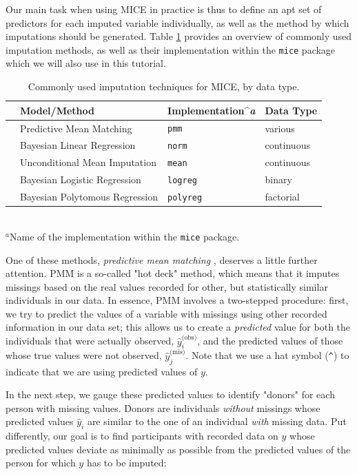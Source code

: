 Our main task when using \textsf{MICE} in practice is thus to define an apt set of predictors for each imputed variable individually, as well as the method by which imputations should be generated. Table \ref{tab:mi-techniques} provides an overview of commonly used imputation methods, as well as their implementation within the \texttt{mice} package \citep{mice-package} which we will also use in this tutorial. 

\begin{table}[htpb]
\centering
\footnotesize
\caption{Commonly used imputation techniques for \textsf{MICE}, by data type.} \label{tab:mi-techniques}
\begin{tabular}{llll}
\toprule
& \textbf{Model/Method} & \textbf{Implementation}^{\textit{a}} & \textbf{Data Type} \\
\midrule
& Predictive Mean Matching & \texttt{pmm} & various \\
& Bayesian Linear Regression & \texttt{norm} & continuous \\
& Unconditional Mean Imputation & \texttt{mean} & continuous \\
& Bayesian Logistic Regression & \texttt{logreg} & binary \\
& Bayesian Polytomous Regression & \texttt{polyreg} & factorial \\
\bottomrule
\end{tabular} \\
$^{\textit{a}}$Name of the implementation within the \texttt{mice} package.
\end{table}

One of these methods, \emph{predictive mean matching} \citep[PMM;][]{morris2014tuning}, deserves a little further attention. PMM is a so-called "hot deck" method, which means that it imputes missings based on the real values recorded for other, but statistically similar individuals in our data. In essence, PMM involves a two-stepped procedure: first, we try to predict the values of a variable with missings using other recorded information in our data set; this allows us to create a \emph{predicted} value for both the individuals that were actually observed, $\hat{y}^{\text{(obs)}}_i$, and the predicted values of those whose true values were not observed, $\hat{y}^{\text{(mis)}}_j$. Note that we use a hat symbol (\texttt{\^}) to indicate that we are using predicted values of $y$. 

In the next step, we gauge these predicted values to identify "donors" for each person with missing values. Donors are individuals \emph{without} missings whose predicted values $\hat{y}_i$ are similar to the one of an individual \emph{with} missing data. Put differently, our goal is to find participants with recorded data on $y$ whose predicted values deviate as minimally as possible from the predicted values of the person for which $y$ has to be imputed:

